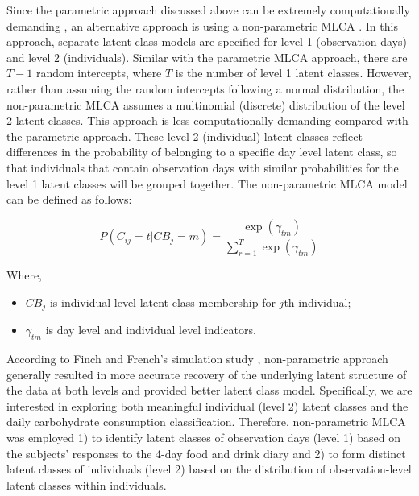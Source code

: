 Since the parametric approach discussed above can be extremely computationally demanding \parencite{van2008using, vermunt2008latent}, an alternative approach is using a non-parametric MLCA \parencite{davidian2008growth}. In this approach, separate latent class models are specified for level 1 (observation days) and level 2 (individuals). Similar with the parametric MLCA approach, there are $T-1$ random intercepts, where $T$ is the number of level 1 latent classes. However, rather than assuming the random intercepts following a normal distribution, the non-parametric MLCA assumes a multinomial (discrete) distribution of the level 2 latent classes. This approach is less computationally demanding compared with the parametric approach. These level 2 (individual) latent classes reflect differences in the probability of belonging to a specific day level latent class, so that individuals that contain observation days with similar probabilities for the level 1 latent classes will be grouped together. The non-parametric MLCA model can be defined as follows: \vspace{-0.7cm}

\begin{equation}
P(C_{ij} = t | CB_j = m)  = \frac{\exp(\gamma_{tm})}{\sum_{r=1}^{T}\exp(\gamma_{tm})}
\end{equation}

Where, 

\begin{itemize}
	\item $CB_j$ is individual level latent class membership for $j$th individual;
	\item $\gamma_{tm}$ is day level and individual level indicators. 
\end{itemize}

According to Finch and French's simulation study \parencite{finch2014multilevel}, non-parametric approach generally resulted in more accurate recovery of the underlying latent structure of the data at both levels and provided better latent class model. Specifically, we are interested in exploring both meaningful individual (level 2) latent classes and the daily carbohydrate consumption classification. Therefore, non-parametric MLCA was employed 1) to identify latent classes of observation days (level 1) based on the subjects' responses to the 4-day food and drink diary and 2) to form distinct latent classes of individuals (level 2) based on the distribution of observation-level latent classes within individuals.\vspace{-0.3cm}
 


